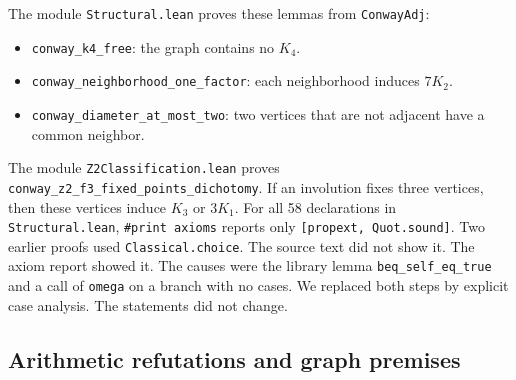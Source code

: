 \documentclass{article}
\theoremstyle{plain}
\theoremstyle{definition}
\numberwithin{equation}{section}
\begin{document}
The module \texttt{Structural.lean} proves these lemmas from \texttt{ConwayAdj}:
\begin{itemize}
 \item \texttt{conway\_k4\_free}: the graph contains no $K_4$.
 \item \texttt{conway\_neighborhood\_one\_factor}: each neighborhood induces $7K_2$.
 \item \texttt{conway\_diameter\_at\_most\_two}: two vertices that are not adjacent have a common neighbor.
\end{itemize}
The module \texttt{Z2Classification.lean} proves \texttt{conway\_z2\_f3\_fixed\_points\_dichotomy}. If an involution fixes three vertices, then these vertices induce $K_3$ or $3K_1$.
For all 58 declarations in \texttt{Structural.lean}, \texttt{\#print axioms} reports only \texttt{[propext, Quot.sound]}.
Two earlier proofs used \texttt{Classical.choice}. The source text did not show it. The axiom report showed it.
The causes were the library lemma \texttt{beq\_self\_eq\_true} and a call of \texttt{omega} on a branch with no cases. We replaced both steps by explicit case analysis. The statements did not change.

\subsection{Arithmetic refutations and graph premises}
\end{document}
